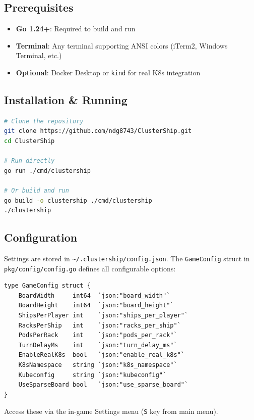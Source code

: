 \documentclass[11pt]{article}
\begin{document}
\subsection{Prerequisites}

\begin{itemize}
    \item \textbf{Go 1.24+}: Required to build and run
    \item \textbf{Terminal}: Any terminal supporting ANSI colors (iTerm2, Windows Terminal, etc.)
    \item \textbf{Optional}: Docker Desktop or \texttt{kind} for real K8s integration
\end{itemize}

\subsection{Installation \& Running}

\begin{lstlisting}[language=bash,numbers=none]
# Clone the repository
git clone https://github.com/ndg8743/ClusterShip.git
cd ClusterShip

# Run directly
go run ./cmd/clustership

# Or build and run
go build -o clustership ./cmd/clustership
./clustership
\end{lstlisting}

\subsection{Configuration}

Settings are stored in \texttt{\textasciitilde/.clustership/config.json}. The \texttt{GameConfig} struct in \texttt{pkg/config/config.go} defines all configurable options:

\begin{lstlisting}
type GameConfig struct {
    BoardWidth     int64  `json:"board_width"`
    BoardHeight    int64  `json:"board_height"`
    ShipsPerPlayer int    `json:"ships_per_player"`
    RacksPerShip   int    `json:"racks_per_ship"`
    PodsPerRack    int    `json:"pods_per_rack"`
    TurnDelayMs    int    `json:"turn_delay_ms"`
    EnableRealK8s  bool   `json:"enable_real_k8s"`
    K8sNamespace   string `json:"k8s_namespace"`
    Kubeconfig     string `json:"kubeconfig"`
    UseSparseBoard bool   `json:"use_sparse_board"`
}
\end{lstlisting}

Access these via the in-game Settings menu (\texttt{S} key from main menu).
\end{document}
